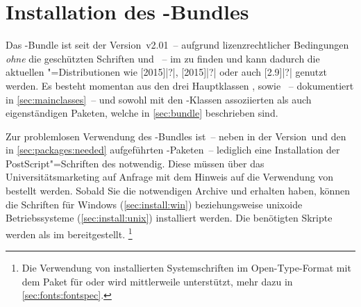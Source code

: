 \section{Installation des \TUDScript-Bundles}
\label{sec:install}%
%
%
%
%
Das \TUDScript-Bundle ist seit der Version~v2.01~-- aufgrund lizenzrechtlicher 
Bedingungen \emph{ohne} die geschützten Schriften \Univers und \DIN~-- im 
\foreignlanguage{english}{%
} zu finden und kann dadurch die aktuellen "=Distributionen wie 
[2015]|?|, 
[2015]|?| oder auch
[2.9]|?| genutzt werden. Es besteht momentan aus 
den drei Hauptklassen ,  sowie 
~-- dokumentiert in \autoref{sec:mainclasses}~-- und sowohl 
mit den \TUDScript-Klassen assoziierten als auch eigenständigen Paketen, welche 
in \autoref{sec:bundle} beschrieben sind.

Zur problemlosen Verwendung des \TUDScript-Bundles ist~-- neben \KOMAScript{} in
der Version~\vKOMAScript und den in \autoref{sec:packages:needed} aufgeführten 
-Paketen~-- lediglich eine Installation der PostScript"=Schriften 
des \TUDCDs notwendig. Diese müssen über das Universitätsmarketing auf 
%
{Anfrage} mit dem Hinweis auf die Verwendung von  bestellt 
werden. Sobald Sie die notwendigen Archive  und 
 erhalten haben, können die Schriften für Windows 
(\autoref{sec:install:win}) beziehungsweise unixoide Betriebssysteme 
(\autoref{sec:install:unix}) installiert werden. Die benötigten Skripte 
werden als  
im \GitHubRepo* bereitgestellt.%
\footnote{%
  Die Verwendung von installierten Systemschriften im Open-Type-Format mit dem 
  Paket  für  oder  wird 
  mittlerweile unterstützt, mehr dazu in \autoref{sec:fonts:fontspec}.%
}

